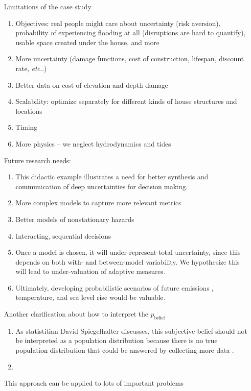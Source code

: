\documentclass[11pt]{article}
\makeatletter
\newcommand{\james}[1]{\todo[color=giallo, textcolor=nero]{\textbf{ATTN James:~}#1}} %
\DeclareRobustCommand\onedot{\futurelet\@let@token\@onedot}
\def\@onedot{\ifx\@let@token.\else.\null\fi\xspace}
\def\etc{\emph{etc}\onedot} \def\vs{\emph{vs}\onedot}
\DeclareRobustCommand\onedot{\futurelet\@let@token\@onedot}
\def\@onedot{\ifx\@let@token.\else.\null\fi\xspace}
\def\etc{\emph{etc}\onedot} \def\vs{\emph{vs}\onedot}
\makeatother
\begin{document}
Limitations of the case study
\begin{enumerate}
    \item Objectives: real people might care about uncertainty (risk aversion), probability of experiencing flooding at all (disruptions are hard to quantify), usable space created under the house, and more
    \item More uncertainty (damage functions, cost of construction, lifespan, discount rate, \etc)
    \item Better data on cost of elevation and depth-damage
    \item Scalability: optimize separately for different kinds of house structures and locations
    \item Timing
    \item More physics -- we neglect hydrodynamics and tides
\end{enumerate}
Future research needs:
\begin{enumerate}
    \item This didactic example illustrates a need for better synthesis and communication of deep uncertainties for decision making.
    \item More complex models to capture more relevant metrics
    \item Better models of nonstationary hazards
    \item Interacting, sequential decisions
    \item Once a model is chosen, it will under-represent total uncertainty, since this depends on both with- and between-model variability. We hypothesize this will lead to under-valuation of adaptive measures.
    \item Ultimately, developing probabilistic scenarios of future emissions \citep[as in][]{srikrishnan_probabilistic:2022}, temperature, and sea level rise would be valuable.
\end{enumerate}
Another clarification about how to interpret the $p_\mathrm{belief}$
\begin{enumerate}
    \item As statistitian David Spiegelhalter discusses, this subjective belief should not be interpreted as a population distribution because there is no true population distribution that could be answered by collecting more data \citep{andorra_spiegelhalter:2021}.\james{Contextualize this}
    \item
\end{enumerate}
This approach can be applied to lots of important problems
\end{document}
